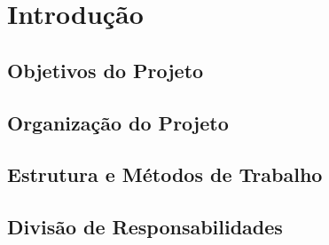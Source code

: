 \documentclass[../main.tex]{subfiles}
\begin{document}
\section{Introdução}
\subsection{Objetivos do Projeto}
\subsection{Organização do Projeto}
\subsection{Estrutura e Métodos de Trabalho}
\subsection{Divisão de Responsabilidades}
\end{document}
